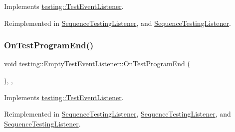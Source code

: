 Implements \mbox{\hyperlink{classtesting_1_1_test_event_listener_ad15b6246d94c268e233487a86463ef3d}{testing\+::\+Test\+Event\+Listener}}.



Reimplemented in \mbox{\hyperlink{class_sequence_testing_listener_aacac5e15bac089460841ff63a5c31f57}{Sequence\+Testing\+Listener}}, and \mbox{\hyperlink{class_sequence_testing_listener_a506077b57a6789daf900e61285a58d8a}{Sequence\+Testing\+Listener}}.

\mbox{\label{classtesting_1_1_empty_test_event_listener_aaa9d683e8e0c850af67a0b92d785ddb9}} 
\subsubsection{\texorpdfstring{OnTestProgramEnd()}{OnTestProgramEnd()}\hspace{0.1cm}{\footnotesize\ttfamily [3/3]}}
{\footnotesize\ttfamily void testing\+::\+Empty\+Test\+Event\+Listener\+::\+On\+Test\+Program\+End (\begin{DoxyParamCaption}\item[{const \mbox{\hyperlink{classtesting_1_1_unit_test}{Unit\+Test}} \&}]{ }\end{DoxyParamCaption})\hspace{0.3cm}{\ttfamily [inline]}, {\ttfamily [override]}, {\ttfamily [virtual]}}



Implements \mbox{\hyperlink{classtesting_1_1_test_event_listener_ad15b6246d94c268e233487a86463ef3d}{testing\+::\+Test\+Event\+Listener}}.



Reimplemented in \mbox{\hyperlink{class_sequence_testing_listener_aacac5e15bac089460841ff63a5c31f57}{Sequence\+Testing\+Listener}}, \mbox{\hyperlink{class_sequence_testing_listener_a506077b57a6789daf900e61285a58d8a}{Sequence\+Testing\+Listener}}, and \mbox{\hyperlink{class_sequence_testing_listener_a506077b57a6789daf900e61285a58d8a}{Sequence\+Testing\+Listener}}.

\mbox{\label{classtesting_1_1_empty_test_event_listener_aa3847c8a3c22d8d69a6006dfdd6589fc}} 
